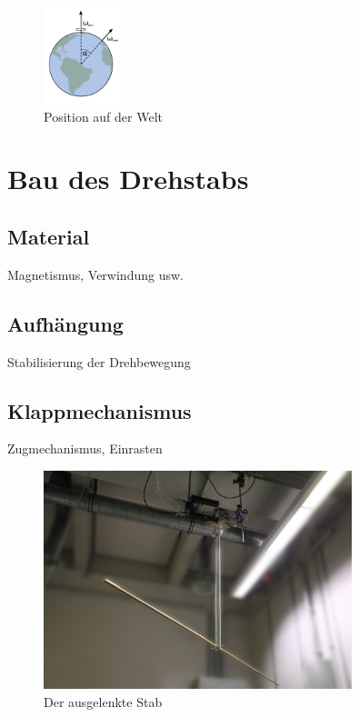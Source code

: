 \documentclass[11pt]{scrartcl}
\begin{document}
\begin{figure}[ht]
\begin{center}
\includegraphics[width=0.2\textwidth]{images/welt.pdf}
\end{center}
\vspace{-1.5\baselineskip}
\caption{Position auf der Welt}
\label{Welt}
\end{figure}


\section{Bau des Drehstabs} %
\subsection{Material}
Magnetismus, Verwindung usw.
\subsection{Aufh\"angung}
Stabilisierung der Drehbewegung
\subsection{Klappmechanismus}
Zugmechanismus, Einrasten

\begin{figure}[ht]
\begin{center}
\includegraphics[width=0.8\textwidth]{images/stab-fertig.jpg}
\end{center}
\vspace{-1.5\baselineskip}
\caption{Der ausgelenkte Stab}
\label{stab-fertig}
\end{figure}
\end{document}
